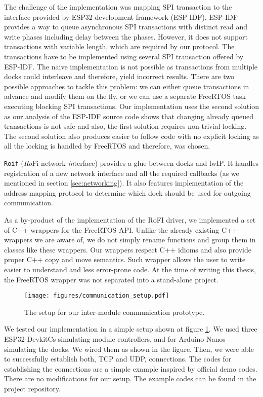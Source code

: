 The challenge of the implementation was mapping SPI transaction to the interface
provided by ESP32 development framework (ESP-IDF). ESP-IDF provides a way to
queue asynchronous SPI transactions with distinct read and write phases
including delay between the phases. However, it does not support transactions
with variable length, which are required by our protocol. The transactions have
to be implemented using several SPI transaction offered by ESP-IDF. The naive
implementation is not possible as transactions from multiple docks could
interleave and therefore, yield incorrect results. There are two possible
approaches to tackle this problem: we can either queue transactions in advance
and modify them on the fly, or we can use a separate FreeRTOS task executing
blocking SPI transactions. Our implementation uses the second solution as our
analysis of the ESP-IDF source code shows that changing already queued
transactions is not safe and also, the first solution requires non-trivial
locking. The second solution also produces easier to follow code with no
explicit locking as all the locking is handled by FreeRTOS and therefore, was
chosen.

\texttt{Roif} (\emph{Ro}Fi network \emph{in}terface) provides a glue between
docks and lwIP. It handles registration of a new network interface and all the
required callbacks (as we mentioned in section \ref{sec:networking}). It also
features implementation of the address mapping protocol to determine which dock
should be used for outgoing communication.

As a by-product of the implementation of the RoFI driver, we implemented a set
of C++ wrappers for the FreeRTOS API. Unlike the already existing C++ wrappers
we are aware of, we do not simply rename functions and group them in classes
like these wrappers. Our wrappers respect C++ idioms and also provide proper C++
copy and move semantics. Such wrapper allows the user to write easier to
understand and less error-prone code. At the time of writing this thesis, the
FreeRTOS wrapper was not separated into a stand-alone project.

\begin{figure}[!t]
    \centering
    \texttt{[image: figures/communication\_setup.pdf]}
    \caption{The setup for our inter-module communication prototype.}
    \label{fig:comm_setup}
\end{figure}

We tested our implementation in a simple setup shown at figure
\ref{fig:comm_setup}. We used three ESP32-DevkitCs simulating module
controllers, and for Arduino Nanos simulating the docks. We wired them as shown
in the figure. Then, we were able to successfully establish both, TCP and UDP,
connections. The codes for establishing the connections are a simple example
inspired by official demo codes. There are no modifications for our setup. The
example codes can be found in the project repository.

